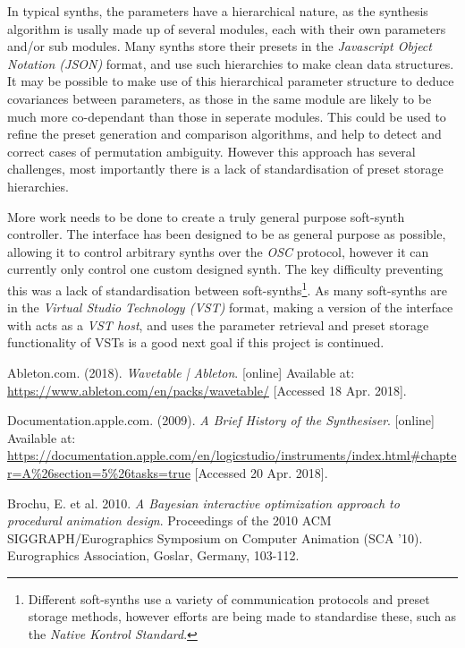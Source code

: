 \documentclass[11pt, oneside]{report}   	%
\begin{document}
{In typical synths, the parameters have a hierarchical nature, as the synthesis algorithm is usally made up of several modules, each with their own parameters and/or sub modules. Many synths store their presets in the \emph{Javascript Object Notation (JSON)} format, and use such hierarchies to make clean data structures. It may be possible to make use of this hierarchical parameter structure to deduce covariances between parameters, as those in the same module are likely to be much more co-dependant than those in seperate modules. This could be used to refine the preset generation and comparison algorithms, and help to detect and correct cases of permutation ambiguity. However this approach has several challenges, most importantly there is a lack of standardisation of preset storage hierarchies.

More work needs to be done to create a truly general purpose soft-synth controller. The interface has been designed to be as general purpose as possible, allowing it to control arbitrary synths over the \emph{OSC} protocol, however it can currently only control one custom designed synth. The key difficulty preventing this was a lack of standardisation between soft-synths\footnote{Different soft-synths use a variety of communication protocols and preset storage methods, however efforts are being made to standardise these, such as the \emph{Native Kontrol Standard}.}. As many soft-synths are in the \emph{Virtual Studio Technology (VST)} format, making a version of the interface with acts as a \emph{VST host}, and uses the parameter retrieval and preset storage functionality of VSTs is a good next goal if this project is continued.

\begin{thebibliography}{9}
\singlespacing

Ableton.com. (2018). \emph{Wavetable | Ableton}. [online] Available at: \url{https://www.ableton.com/en/packs/wavetable/} [Accessed 18 Apr. 2018].

Documentation.apple.com. (2009). \emph{A Brief History of the Synthesiser}. [online] Available at: \url{https://documentation.apple.com/en/logicstudio/instruments/index.html#chapter=A\%26section=5\%26tasks=true} [Accessed 20 Apr. 2018].

Brochu, E. et al. 2010. \emph{A Bayesian interactive optimization approach to procedural animation design}. Proceedings of the 2010 ACM SIGGRAPH/Eurographics Symposium on Computer Animation (SCA '10). Eurographics Association, Goslar, Germany, 103-112.


\end{thebibliography}}
\end{document}
